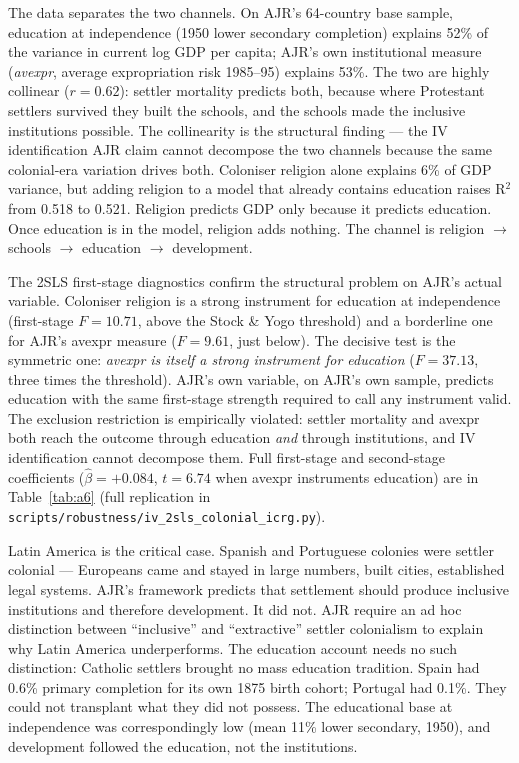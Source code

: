 \documentclass[12pt,letterpaper]{article}
\begin{document}
The data separates the two channels. On AJR's 64-country base sample,
education at independence (1950 lower secondary completion) explains
52\% of the variance in current log GDP per capita; AJR's own
institutional measure (\emph{avexpr}, average expropriation risk
1985--95) explains 53\%. The two are highly collinear ($r = 0.62$):
settler mortality predicts both, because where Protestant settlers
survived they built the schools, and the schools made the inclusive
institutions possible. The
collinearity is the structural finding --- the IV identification AJR
claim cannot decompose the two channels because the same colonial-era
variation drives both. Coloniser religion alone explains 6\% of GDP
variance, but adding religion to a model that already contains
education raises R$^2$ from 0.518 to 0.521. Religion predicts GDP only
because it predicts education. Once education is in the model,
religion adds nothing. The channel is religion $\to$ schools $\to$
education $\to$ development.

The 2SLS first-stage diagnostics confirm the structural problem on
AJR's actual variable. Coloniser religion is a strong instrument for
education at independence (first-stage $F=10.71$, above the Stock \&
Yogo threshold) and a borderline one for AJR's avexpr measure
($F=9.61$, just below). The decisive test is the symmetric one:
\emph{avexpr is itself a strong instrument for education}
($F=37.13$, three times the threshold). AJR's own variable, on AJR's
own sample, predicts education with the same first-stage strength
required to call any instrument valid. The exclusion restriction is
empirically violated: settler mortality and avexpr both reach the
outcome through education \emph{and} through institutions, and IV
identification cannot decompose them. Full first-stage and
second-stage coefficients ($\hat\beta=+0.084$, $t=6.74$ when avexpr
instruments education) are in Table~\ref{tab:a6} (full replication in
\texttt{scripts/robustness/iv\_2sls\_colonial\_icrg.py}).

Latin America is the critical case. Spanish and Portuguese colonies were
settler colonial --- Europeans came and stayed in large numbers, built
cities, established legal systems. AJR's framework predicts that
settlement should produce inclusive institutions and therefore
development. It did not. AJR require an ad hoc distinction between
``inclusive'' and ``extractive'' settler colonialism to explain why Latin
America underperforms. The education account needs no such distinction:
Catholic settlers brought no mass education tradition. Spain had 0.6\%
primary completion for its own 1875 birth cohort; Portugal had 0.1\%.
They could not transplant what they did not possess. The educational
base at independence was correspondingly low (mean 11\% lower secondary,
1950), and development followed the education, not the institutions.
\end{document}
